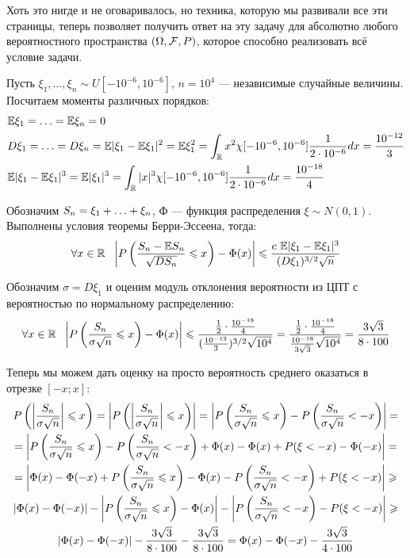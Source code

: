 \begin{anote}
	Хоть это нигде и не оговаривалось, но техника, которую мы развивали все эти страницы, теперь позволяет получить ответ на эту задачу для абсолютно любого вероятностного пространства $(\Omega, \mathcal{F}, P)$, которое способно реализовать всё условие задачи.
\end{anote}

\begin{solution}
    Пусть $\xi_1, \ldots, \xi_n \sim U[-10^{-6}, 10^{-6}]$, $n = 10^4$ --- независимые случайные величины. Посчитаем моменты различных порядков:
    \begin{align*}
        &{\mathbb{E}\xi_1 = \ldots = \mathbb{E}\xi_n = 0}
        \\
        &{D\xi_1 = \ldots = D\xi_n = \mathbb{E}|\xi_1 - \mathbb{E}\xi_1|^2 = \mathbb{E}\xi_1^2 = \int_{\mathbb{R}} x^2 \chi[-10^{-6}, 10^{-6}] \frac{1}{2 \cdot 10^{-6}}dx = \frac{10^{-12}}{3}}
        \\
        &{\mathbb{E}|\xi_1 - \mathbb{E}\xi_1|^3=\mathbb{E}|\xi_1|^3 =  \int_{\mathbb{R}} |x|^3 \chi[-10^{-6}, 10^{-6}] \frac{1}{2 \cdot 10^{-6}} dx = \frac{10^{-18}}{4}}
    \end{align*}

    Обозначим $S_n = \xi_1 + \ldots + \xi_n$, Ф --- функция распределения $\xi \sim N(0, 1)$. Выполнены условия теоремы Берри-Эссеена, тогда:
    \[
        \forall x \in \R \ \ \md{P \ps{\frac{S_n-\E S_n}{\sqrt{DS_n}} \le x} - \Phi(x)} \le \frac{c \ \E|\xi_1-\E\xi_1|^3}{(D\xi_1)^{3/2} \sqrt{n}}
    \]

    Обозначим $\sigma = D\xi_1$ и оценим модуль отклонения вероятности из ЦПТ с вероятностью по нормальному распределению:
    \[
        \forall x \in \mathbb{R}\ \ \left|P\left(\frac{S_n}{\sigma \sqrt{n}} \leqslant x\right) - \Phi(x)\right| \leqslant \frac{\frac{1}{2} \cdot \frac{10^{-18}}{4}}{(\frac{10^{-12}}{3})^{3/2}\sqrt{10^4}} = \frac{\frac{1}{2} \cdot \frac{10^{-18}}{4}}{\frac{10^{-18}}{3 \sqrt{3}}\sqrt{10^4}} = \frac{3\sqrt{3}}{8 \cdot 100}
    \]

    Теперь мы можем дать оценку на просто вероятность среднего оказаться в отрезке $[-x; x]$:
    \begin{multline*}
        P\left(\left|\frac{S_n}{\sigma \sqrt{n}}\right| \leqslant x\right) = \left|P\left(\left|\frac{S_n}{\sigma \sqrt{n}}\right| \leqslant x\right)\right| = \left|P\left(\frac{S_n}{\sigma \sqrt{n}} \leqslant x\right) - P\left(\frac{S_n}{\sigma \sqrt{n}} < -x\right)\right| =
        \\
        = \left|P \left(\frac{S_n}{\sigma \sqrt{n}} \leqslant x\right) - P \left(\frac{S_n}{\sigma \sqrt{n}} < -x\right) + \Phi(x) - \Phi(x) + P(\xi < -x) - \Phi(-x)\right| =
        \\
        = \left|\Phi(x) - \Phi(-x) + P\left(\frac{S_n}{\sigma \sqrt{n}} \leqslant x\right) - \Phi(x) - P\left(\frac{S_n}{\sigma \sqrt{n}} < -x\right) + P(\xi < -x)\right| \geqslant
        \\
        |\Phi(x) - \Phi(-x)| - \left|P\left(\frac{S_n}{\sigma \sqrt{n}} \leqslant x\right) - \Phi(x)\right| - \left|P\left(\frac{S_n}{\sigma \sqrt{n}} < -x\right) - P(\xi < -x)\right| \geqslant
        \\
        |\Phi(x) - \Phi(-x)| - \frac{3\sqrt{3}}{8 \cdot 100} - \frac{3\sqrt{3}}{8 \cdot 100} = \Phi(x) - \Phi(-x) - \frac{3\sqrt{3}}{4 \cdot 100}
    \end{multline*}


\end{solution}
